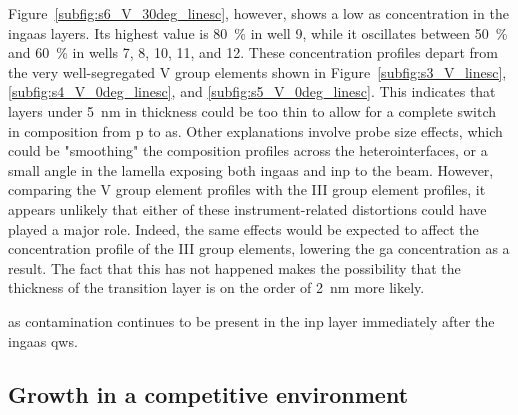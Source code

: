 Figure~\ref{subfig:s6_V_30deg_linesc}, however, shows a low \acl{as} concentration in the \acs{ingaas} layers. Its highest value is \qty{80}{\%} in well \num{9}, while it oscillates between \qty{50}{\%} and \qty{60}{\%} in wells \num{7}, \num{8}, \num{10}, \num{11}, and \num{12}. These concentration profiles depart from the very well-segregated V group elements shown in Figure~\ref{subfig:s3_V_linesc}, \ref{subfig:s4_V_0deg_linesc}, and \ref{subfig:s5_V_0deg_linesc}. This indicates that layers under \qty{5}{\nano\metre} in thickness could be too thin to allow for a complete switch in composition from \acl{p} to \acs{as}. Other explanations involve probe size effects, which could be "smoothing" the composition profiles across the heterointerfaces, or a small angle in the lamella exposing both \acs{ingaas} and \acs{inp} to the beam. However, comparing the V group element profiles with the III group element profiles, it appears unlikely that either of these instrument-related distortions could have played a major role. Indeed, the same effects would be expected to affect the concentration profile of the III group elements, lowering the \acl{ga} concentration as a result. The fact that this has not happened makes the possibility that the thickness of the transition layer is on the order of \qty{2}{\nano\metre} more likely. 

\Acl{as} contamination continues to be present in the \acs{inp} layer immediately after the \acs{ingaas} \acl{qw}s.

\subsection{Growth in a competitive environment}
\label{sec:competitive}


